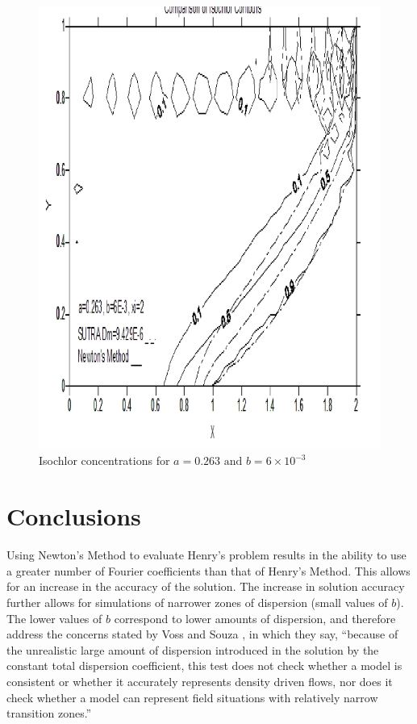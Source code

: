 \documentclass{article}
\newcommand{\spbox}[1]{ \text{ #1 }} %
\begin{document}
\begin{figure}[htp]
    \centering
    \includegraphics[totalheight=0.45\textheight,viewport=3mm 4mm 205mm 292mm]{image4}
    \caption{Isochlor concentrations for $a = 0.263 \spbox{and} b = 6 \times
    10^{-3}$} \label{fig:b6x10-3}
\end{figure}

\section{Conclusions}

Using Newton's Method to evaluate Henry's problem results in the ability to use
a greater number of Fourier coefficients than that of Henry's Method. This
allows for an increase in the accuracy of the solution. The increase in solution
accuracy further allows for simulations of narrower zones of dispersion (small
values of $b$). The lower values of $b$ correspond to lower amounts of
dispersion, and therefore address the concerns stated by Voss and Souza
\cite{Voss}, in which they say, ``because of the unrealistic large amount of
dispersion introduced in the solution by the constant total dispersion
coefficient, this test does not check whether a model is consistent or whether
it accurately represents density driven flows, nor does it check whether a model
can represent field situations with relatively narrow transition zones.'' 
\end{document}
